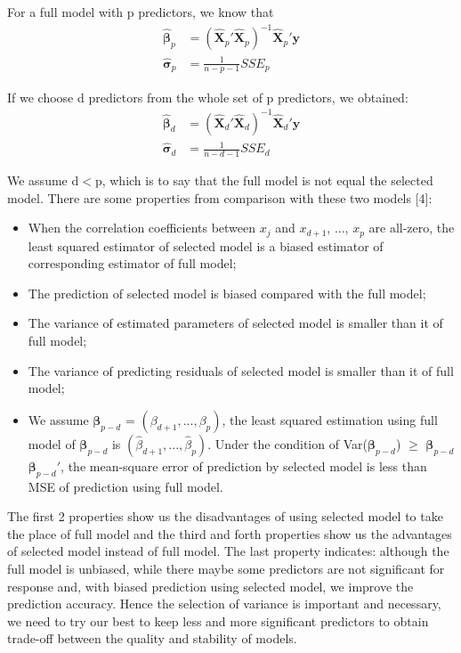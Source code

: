 \documentclass[a4paper]{article}
\begin{document}
\noindent
For a full model with p predictors, we know that 
\begin{equation*}
\begin{aligned}
  \hat{\bm{\beta}}_p & = (\hat{\textbf{X}}_p'\hat{\textbf{X}}_p)^{-1}\hat{\textbf{X}}_p'\textbf{y} \\ 
  \hat{\bm{\sigma}}_p & = \frac{1}{n-p-1}SSE_{p}
\end{aligned}
\end{equation*}

\noindent
If we choose d predictors from the whole set of p predictors, we obtained:
\begin{equation*}
\begin{aligned}
  \hat{\bm{\beta}}_d & = (\hat{\textbf{X}}_d'\hat{\textbf{X}}_d)^{-1}\hat{\textbf{X}}_d'\textbf{y} \\ 
  \hat{\bm{\sigma}}_d & = \frac{1}{n-d-1}SSE_{d}
\end{aligned}
\end{equation*}

\noindent
We assume d$<$p, which is to say that the full model is not equal the selected model. There are some properties from comparison with these two models [4]:
\begin{itemize}
    \item When the correlation coefficients between $x_j$ and $x_{d+1}$, ..., $x_p$ are all-zero, the least squared estimator of selected model is a biased estimator of corresponding estimator of full model;
    \item The prediction of selected model is biased compared with the full model;
    \item The variance of estimated parameters of selected model is smaller than it of full model;
    \item The variance of predicting residuals of selected model is smaller than it of full model;
    \item We assume $\bm{\beta}_{p-d}$ = $(\beta_{d+1}, ..., \beta_p)$, the least squared estimation using full model of $\bm{\beta}_{p-d}$ is $(\hat{\beta}_{d+1}, ..., \hat{\beta}_p)$. Under the condition of Var($\bm{\beta}_{p-d}$) $\geq$ $\bm{\beta}_{p-d}$ $\bm{\beta}_{p-d}'$, the mean-square error of prediction by selected model is less than MSE of prediction using full model.
\end{itemize}
The first 2 properties show us the disadvantages of using selected model to take the place of full model and the third and forth properties show us the advantages of selected model instead of full model. The last property indicates: although the full model is unbiased, while there maybe some predictors are not significant for response and, with biased prediction using selected model, we improve the prediction accuracy. Hence the selection of variance is important and necessary, we need to try our best to keep less and more significant predictors to obtain trade-off between the quality and stability of models.
\end{document}

